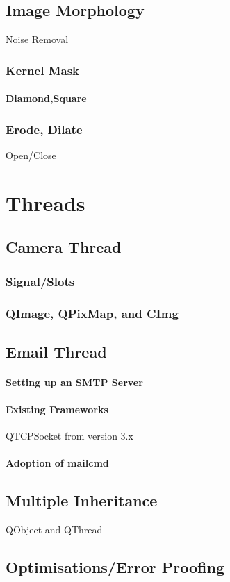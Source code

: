 \documentclass[11pt]{article} %
\begin{document}
\subsection{Image Morphology}{Noise Removal}
\subsubsection{Kernel Mask}
\paragraph{Diamond,Square}
\subsubsection{Erode, Dilate}{Open/Close}
\section{Threads}
\subsection{Camera Thread}
\subsubsection{Signal/Slots}
\subsubsection{QImage, QPixMap, and CImg}
\subsection{Email Thread}
\paragraph{Setting up an SMTP Server}
\paragraph{Existing Frameworks}{QTCPSocket from version 3.x}
\paragraph{Adoption of mailcmd}
\subsection{Multiple Inheritance}{QObject and QThread}
\subsection{Optimisations/Error Proofing}
\end{document}
